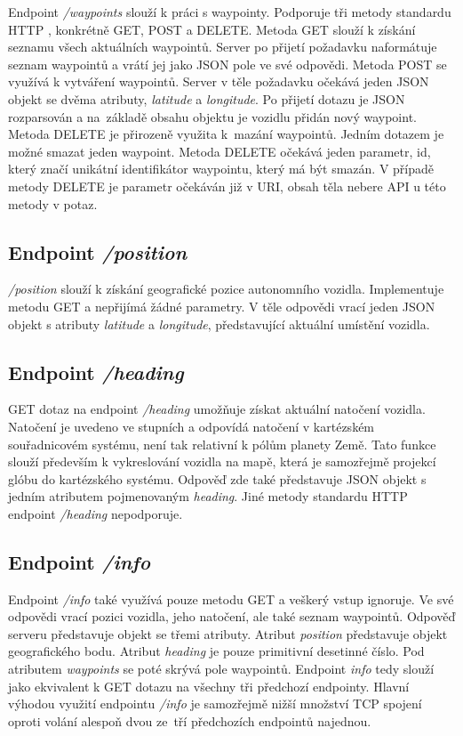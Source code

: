 \documentclass[czech, bachelor]{diploma}
\begin{document}
Endpoint \emph{/waypoints} slouží k práci s waypointy. Podporuje tři metody standardu HTTP \cite{http-source}, konkrétně GET, POST
a DELETE.  Metoda GET slouží k získání seznamu všech aktuálních waypointů. Server po přijetí požadavku naformátuje seznam
waypointů a vrátí jej jako JSON pole ve své odpovědi. Metoda POST se využívá k vytváření waypointů. Server v těle požadavku
očekává jeden JSON objekt se dvěma atributy, \emph{latitude} a \emph{longitude}. Po přijetí dotazu je JSON rozparsován a
na~základě obsahu objektu je vozidlu přidán nový waypoint. Metoda DELETE je přirozeně využita k~mazání waypointů. Jedním dotazem
je možné smazat jeden waypoint. Metoda DELETE očekává jeden parametr, id, který značí unikátní identifikátor waypointu, který má
být smazán. V případě metody DELETE je parametr očekáván již v URI, obsah těla nebere API u této metody v potaz.

\subsection{Endpoint \emph{/position}}

\emph{/position} slouží k získání geografické pozice autonomního vozidla. Implementuje metodu GET a nepřijímá žádné parametry.
V těle odpovědi vrací jeden JSON objekt s atributy \emph{latitude} a \emph{longitude}, představující aktuální umístění vozidla.

\subsection{Endpoint \emph{/heading}}

GET dotaz na endpoint \emph{/heading} umožňuje získat aktuální natočení vozidla. Natočení je uvedeno ve stupních a odpovídá
natočení v kartézském souřadnicovém systému, není tak relativní k pólům planety Země. Tato funkce slouží především k vykreslování
vozidla na mapě, která je samozřejmě projekcí glóbu do kartézského systému. Odpověď zde také představuje JSON objekt s jedním
atributem pojmenovaným \emph{heading}. Jiné metody standardu HTTP endpoint \emph{/heading} nepodporuje.

\subsection{Endpoint \emph{/info}}

Endpoint \emph{/info} také využívá pouze metodu GET a veškerý vstup ignoruje. Ve své odpovědi vrací pozici vozidla, jeho
natočení, ale také seznam waypointů.  Odpověď serveru představuje objekt se třemi atributy. Atribut \emph{position} představuje
objekt geografického bodu. Atribut \emph{heading} je pouze primitivní desetinné číslo. Pod atributem \emph{waypoints} se poté
skrývá pole waypointů. Endpoint \emph{info} tedy slouží jako ekvivalent k GET dotazu na všechny tři předchozí endpointy. Hlavní
výhodou využití endpointu \emph{/info} je samozřejmě nižší množství TCP spojení oproti volání alespoň dvou ze~tří předchozích
endpointů najednou.
\end{document}
